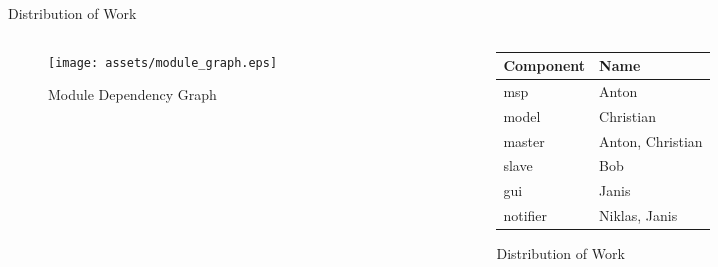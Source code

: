\documentclass[11pt,aspectratio=169]{beamer}
\begin{document}
    \begin{frame}[allowframebreaks]{Distribution of Work}
        
        \begin{columns}
            \begin{column}{0.5\linewidth}
                \centering
                \begin{figure}[h]
                    \texttt{[image: assets/module\_graph.eps]}
                    \caption{Module Dependency Graph}
                \end{figure}
            \end{column}
           
            \begin{column}{0.5\linewidth}
                 \centering
                 \begin{figure}[h]
                     \begin{tabular}{l|l}
                         \toprule
                         Component & Name\\
                         \midrule
                         msp       & Anton\\
                         model     & Christian\\
                         master    & Anton, Christian\\
                         slave     & Bob\\
                         gui       & Janis\\
                         notifier  & Niklas, Janis\\
                         \bottomrule
                        \end{tabular}
                        \caption{Distribution of Work}
                    \end{figure}
            \end{column}
        \end{columns}
        
    \end{frame}
\end{document}
